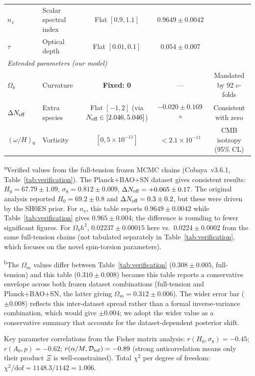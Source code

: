 \documentclass[aps,prd,twocolumn,superscriptaddress,showpacs,preprintnumbers,nofootinbib,longbibliography,floatfix]{revtex4-2}
\newcommand{\Dinf}{\mathcal{D}_{\rm inf}}
\newcommand{\Neff}{N_{\rm eff}}
\begin{document}
\begin{table}[t]
\begin{ruledtabular}
\begin{tabular}{llccc}
$n_s$ & Scalar spectral index & Flat $[0.9,1.1]$ & $0.9649 \pm 0.0042$ & \\
$\tau$ & Optical depth & Flat $[0.01,0.1]$ & $0.054 \pm 0.007$ & \\
\hline
\multicolumn{5}{l}{\textit{Extended parameters (our model)}} \\
$\Omega_k$ & Curvature & \textbf{Fixed: 0} & --- & Mandated by 92 $e$-folds \\
$\Delta \Neff$ & Extra species & Flat $[-1,2]$ (via $N_{\rm eff} \in [2.046, 5.046]$) & $-0.020\pm 0.169$\,\textsuperscript{a} & Consistent with zero \\
$(\omega/H)_0$ & Vorticity & $[0,5\times 10^{-11}]$ & $< 2.1\times 10^{-11}$ & CMB isotropy (95\% CL) \\
\end{tabular}
\end{ruledtabular}
\end{table}

\textsuperscript{a}Verified values from the full-tension frozen MCMC chains (Cobaya~v3.6.1, Table~\ref{tab:verification}). The Planck+BAO+SN dataset gives consistent results: $H_0 = 67.79 \pm 1.09$, $\sigma_8 = 0.812 \pm 0.009$, $\Delta\Neff = +0.065 \pm 0.17$. The original analysis reported $H_0 = 69.2 \pm 0.8$ and $\Delta\Neff = 0.3 \pm 0.2$, but these were driven by the SH0ES prior. For $n_s$, this table reports $0.9649 \pm 0.0042$ while Table~\ref{tab:verification} gives $0.965 \pm 0.004$; the difference is rounding to fewer significant figures. For $\Omega_b h^2$, $0.02237 \pm 0.00015$ here vs.\ $0.0224 \pm 0.0002$ from the same full-tension chains (not tabulated separately in Table~\ref{tab:verification}, which focuses on the novel spin-torsion parameters).

\textsuperscript{b}The $\Omega_m$ values differ between Table~\ref{tab:verification} ($0.308 \pm 0.005$, full-tension) and this table ($0.310 \pm 0.008$) because this table reports a conservative envelope across both frozen dataset combinations (full-tension and Planck+BAO+SN, the latter giving $\Omega_m = 0.312 \pm 0.006$). The wider error bar ($\pm 0.008$) reflects this inter-dataset spread rather than a formal inverse-variance combination, which would give $\pm 0.004$; we adopt the wider value as a conservative summary that accounts for the dataset-dependent posterior shift.

Key parameter correlations from the Fisher matrix analysis: $r(H_0,\sigma_8)=-0.45$; $r(A_0,p)=-0.62$; $r(\alpha/M,\Dinf)=-0.89$ (strong anticorrelation means only their product $\Xi$ is well-constrained). Total $\chi^2$ per degree of freedom: $\chi^2/\text{dof}=1148.3/1142=1.006$.
\end{document}
